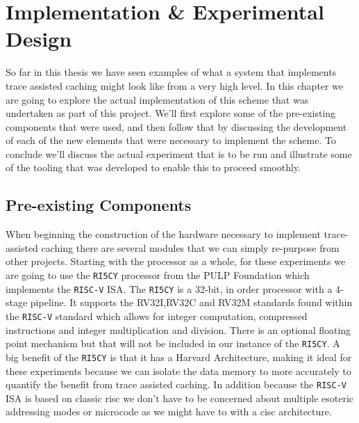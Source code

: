 \chapter{Implementation \& Experimental Design}
\label{chap:experimental-design}

So far in this thesis we have seen examples of what a system that implements trace assisted caching might look like from a very high level. In this chapter we are going to explore the actual implementation of this scheme that was undertaken as part of this project. We'll first explore some of the pre-existing components that were used, and then follow that by discussing the development of each of the new elements that were necessary to implement the scheme. To conclude we'll discuss the actual experiment that is to be run and illustrate some of the tooling that was developed to enable this to proceed smoothly.

\section{Pre-existing Components}

When beginning the construction of the hardware necessary to implement trace-assisted caching there are several modules that we can simply re-purpose from other projects. Starting with the processor as a whole, for these experiments we are going to use the \texttt{RI5CY}\cite{gautschiNearThresholdRISCVCore2017} processor from the PULP Foundation which implements the \texttt{RISC-V} ISA. The \texttt{RI5CY} is a 32-bit, in order processor with a 4-stage pipeline. It supports the RV32I,RV32C and RV32M standards found within the \texttt{RISC-V} standard which allows for integer computation, compressed instructions and integer multiplication and division. There is an optional floating point mechanism but that will not be included in our instance of the \texttt{RI5CY}. A big benefit of the \texttt{RI5CY} is that it has a Harvard Architecture, making it ideal for these experiments because we can isolate the data memory to more accurately to quantify the benefit from trace assisted caching. In addition because the \texttt{RISC-V} ISA is based on classic \gls{risc} we don't have to be concerned about multiple esoteric addressing modes or microcode as we might have to with a \gls{cisc} architecture. 

